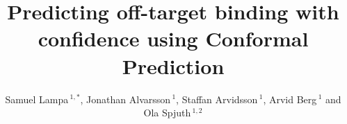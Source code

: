 \documentclass[utf8]{frontiersSCNS} %
\def\firstAuthorLast{Lampa {et~al.}} %
\def\Authors{Samuel Lampa\,$^{1,*}$, Jonathan Alvarsson\,$^{1}$, Staffan Arvidsson\,$^{1}$, Arvid Berg\,$^{1}$ and Ola Spjuth\,$^{1,2}$}
\begin{document}
\onecolumn
{}

\title[Predicting off-target binding with confidence using Conformal
Prediction]{Predicting off-target binding with confidence using Conformal
Prediction}

\author[\firstAuthorLast ]{\Authors} %
\address{} %
\correspondance{} %

\extraAuth{}%


\maketitle
\end{document}

